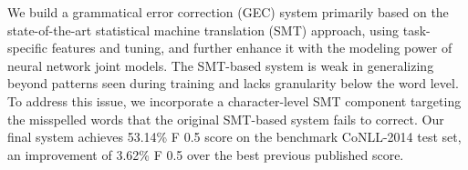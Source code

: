We build a grammatical error correction (GEC) system primarily based on the state-of-the-art statistical machine translation (SMT) approach, using task-specific features and tuning, and further enhance it with the modeling power of neural network joint models. The SMT-based system is weak in generalizing beyond patterns seen during training and lacks granularity below the word level. To address this issue, we incorporate a character-level SMT component targeting the misspelled words that the original SMT-based system fails to correct. Our final system achieves 53.14\% F 0.5 score on the benchmark CoNLL-2014 test set, an improvement of 3.62\% F 0.5 over the best previous published score.
